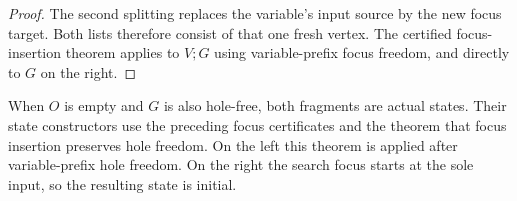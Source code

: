 \begin{proof}
The second splitting replaces the variable's input source by the new focus
target. Both lists therefore consist of that one fresh vertex. The certified
focus-insertion theorem applies to $V;G$ using variable-prefix focus freedom,
and directly to $G$ on the right.
\end{proof}
When $O$ is empty and $G$ is also hole-free, both fragments are actual states.
Their state constructors use the preceding focus certificates and the theorem
that focus insertion preserves hole freedom. On the left this theorem is
applied after variable-prefix hole freedom. On the right the search focus
starts at the sole input, so the resulting state is initial.

